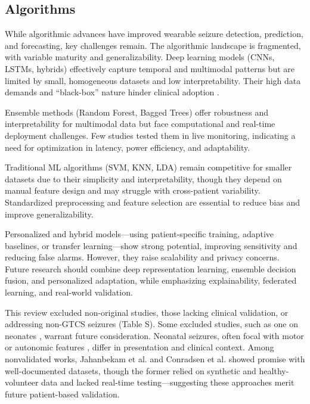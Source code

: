 \subsection{Algorithms}
While algorithmic advances have improved wearable seizure detection, prediction, and forecasting, key challenges remain. The algorithmic landscape is fragmented, with variable maturity and generalizability. Deep learning models (CNNs, LSTMs, hybrids) effectively capture temporal and multimodal patterns but are limited by small, homogeneous datasets and low interpretability. Their high data demands and “black-box” nature hinder clinical adoption \cite{Kumar2023-yb}.

Ensemble methods (Random Forest, Bagged Trees) offer robustness and interpretability for multimodal data but face computational and real-time deployment challenges. Few studies tested them in live monitoring, indicating a need for optimization in latency, power efficiency, and adaptability.

Traditional ML algorithms (SVM, KNN, LDA) remain competitive for smaller datasets due to their simplicity and interpretability, though they depend on manual feature design and may struggle with cross-patient variability. Standardized preprocessing and feature selection are essential to reduce bias and improve generalizability.

Personalized and hybrid models—using patient-specific training, adaptive baselines, or transfer learning—show strong potential, improving sensitivity and reducing false alarms. However, they raise scalability and privacy concerns. Future research should combine deep representation learning, ensemble decision fusion, and personalized adaptation, while emphasizing explainability, federated learning, and real-world validation.

This review excluded non-original studies, those lacking clinical validation, or addressing non-GTCS seizures (Table S). Some excluded studies, such as one on neonates \cite{Chen2023-ns}, warrant future consideration. Neonatal seizures, often focal with motor or autonomic features \cite{Ziobro24-neo}, differ in presentation and clinical context. Among nonvalidated works, Jahanbekam et al. and Conradsen et al. showed promise with well-documented datasets, though the former relied on synthetic and healthy-volunteer data and lacked real-time testing—suggesting these approaches merit future patient-based validation.